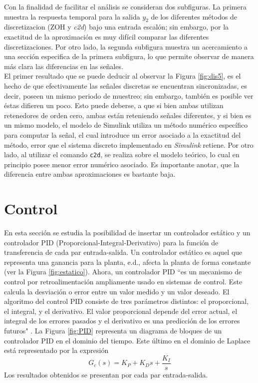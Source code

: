 \documentclass[journal]{IEEEtran}
\begin{document}
Con la  finalidad de facilitar el análisis se consideran dos subfiguras. La primera muestra la respuesta temporal para la salida $y_2$ de los diferentes métodos de discretizacion (ZOH y \textit{c2d}) bajo una entrada escalón; sin embargo, por la exactitud de la aproximación es muy difícil comparar las diferentes discretizaciones. Por otro lado, la segunda subfigura muestra un acercamiento a una sección especifica de la primera subfigura, lo que permite observar de manera más clara las diferencias en las señales.\\ 

El primer resultado que se puede deducir al observar la Figura \ref{fig:dis5}, es el hecho de que efectivamente las señales discretas se encuentran sincronizadas, es decir, poseen un mismo periodo de muestreo; sin embargo, también es posible ver éstas difieren un poco. Esto puede deberse, a que si bien ambas utilizan retenedores de orden cero, ambas están reteniendo señales diferentes, y si bien es un mismo modelo, el modelo de Simulink utiliza un método numérico específico para computar la señal, el cual introduce un error asociado a la exactitud del método, error que el sistema discreto implementado en \textit{Simulink} retiene. Por otro lado, al utilizar el comando \texttt{c2d}, se realiza sobre el modelo teórico, lo cual en principio posee menor error numérico asociado. Es importante anotar, que la diferencia entre ambas aproximaciones es bastante baja.


\section{Control}
En esta sección se estudia la posibilidad de insertar un controlador estático y un controlador PID (Proporcional-Integral-Derivativo) para la función de transferencia de cada par entrada-salida. Un controlador estático es aquel que representa una ganancia para la planta, e.d., afecta la planta de forma constante (ver la Figura \ref{fig:estatico}). Ahora, un controlador PID ``es un mecanismo de control por retroalimentación ampliamente usado en sistemas de control. Este calcula la desviación o error entre un valor medido y un valor deseado. El algoritmo del control PID consiste de tres parámetros distintos: el proporcional, el integral, y el derivativo. El valor proporcional depende del error actual, el integral de los errores pasados y el derivativo es una predicción de los errores futuros" \cite{wiki:PID}. La Figura \ref{fig:PID} representa un diagrama de bloques de un controlador PID en el dominio del tiempo. Este último en el dominio de Laplace está representado por la expresión
\begin{equation}
\label{eq:PID}
G_c(s) = K_P+K_Ds+\dfrac{K_I}{s}
\end{equation}
Los resultados obtenidos se presentan por cada par entrada-salida.\\
\end{document}
